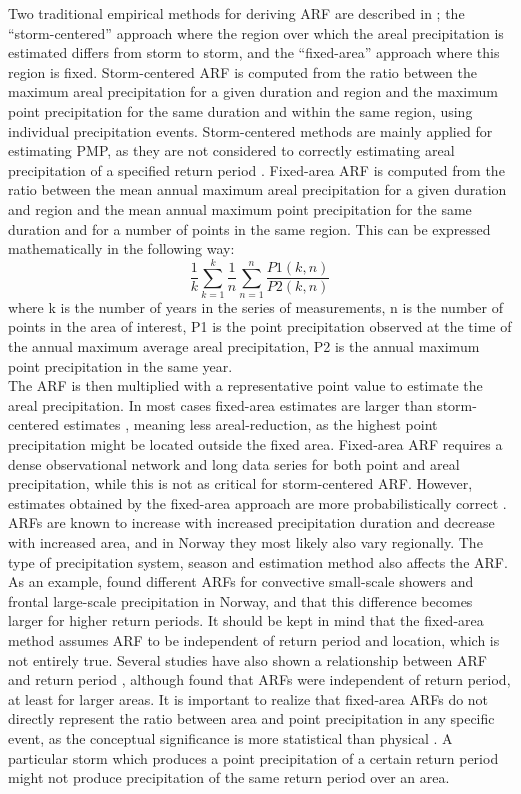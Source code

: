 \documentclass[12pt,a4paper,english]{article}
\begin{document}
Two traditional empirical methods for deriving ARF are described in \cite{Bell1976}; the ``storm-centered'' approach where the region over which the areal precipitation is estimated differs from storm to storm, and the ``fixed-area'' approach where this region is fixed. Storm-centered ARF is computed from the ratio between the maximum areal precipitation for a given duration and region and the maximum point precipitation for the same duration and within the same region, using individual precipitation events. Storm-centered methods are mainly applied for estimating PMP, as they are not considered to correctly estimating areal precipitation of a specified return period \citep{Omolayo1993}. Fixed-area ARF is computed from the ratio between the mean annual maximum areal precipitation for a given duration and region and the mean annual maximum point precipitation for the same duration and for a number of points in the same region. This can be expressed mathematically in the following way:
\begin{equation}
\frac{1}{k}\sum_{k=1}^k\frac{1}{n}\sum_{n=1}^n\frac{P1(k,n)}{P2(k,n)}
\end{equation}
where k is the number of years in the series of measurements, n is the number of points in the area of interest, P1 is the point precipitation observed at the time of the annual maximum average areal precipitation, P2 is the annual maximum point precipitation in the same year.\\ 
The ARF is then multiplied with a representative point value to estimate the areal precipitation. In most cases fixed-area estimates are larger than storm-centered estimates \citep{SivapalanandBloschl1998}, meaning less areal-reduction, as the highest point precipitation might be located outside the fixed area. Fixed-area ARF requires a dense observational network and long data series for both point and areal precipitation, while this is not as critical for storm-centered ARF. However, estimates obtained by the fixed-area approach are more probabilistically correct \citep{SvenssonandJones2010b}.
ARFs are known to increase with increased precipitation duration and decrease with increased area, and in Norway they most likely also vary regionally. The type of precipitation system, season and estimation method also affects the ARF. As an example, \cite{Skaugen1997} found different ARFs for convective small-scale showers and frontal large-scale precipitation in Norway, and that this difference becomes larger for higher return periods. It should be kept in mind that the fixed-area method assumes ARF to be independent of return period and location, which is not entirely true. Several studies have also shown a relationship between ARF and return period \citep{Bell1976, AllenandDeGaetano2005a, AsquithandFamiglietti2000}, although \cite{GrebnerandRoesch1997} found that ARFs were independent of return period, at least for larger areas. 
It is important to realize that fixed-area ARFs do not directly represent the ratio between area and point precipitation in any specific event, as the conceptual significance is more statistical than physical \citep{Bell1976}. A particular storm which produces a point precipitation of a certain return period might not produce precipitation of the same return period over an area. 
\end{document}
